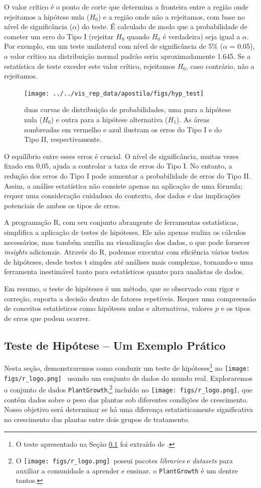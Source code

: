 \documentclass[article]{memoir}
\newcommand{\rlogo}{\protect\texttt{[image: figs/r\_logo.png]}}
\begin{document}
O valor crítico é o ponto de corte que determina a fronteira entre a região onde rejeitamos a hipótese nula ($H_0$) e a região onde não a rejeitamos, com base no nível de significância ($\alpha$) do teste. É calculado de modo que a probabilidade de cometer um erro do Tipo I (rejeitar $H_0$ quando $H_0$ é verdadeira) seja igual a $\alpha$. Por exemplo, em um teste unilateral com nível de significância de 5\% ($\alpha$ = 0.05), o valor crítico na distribuição normal padrão seria aproximadamente 1.645. Se a estatística de teste exceder este valor crítico, rejeitamos $H_0$, caso contrário, não a rejeitamos.


\begin{figure}[ht]
	\centering
	\texttt{[image: ../../vis\_rep\_data/apostila/figs/hyp\_test]}
	\caption{duas curvas de distribuição de probabilidades, uma para a hipótese nula ($H_0$) e outra para a hipótese alternativa ($H_1$). As áreas sombreadas em vermelho e azul ilustram os erros do Tipo I e do Tipo II, respectivamente.}
	\label{fig:hyptest}
\end{figure}


O equilíbrio entre esses erros é crucial. O nível de significância, muitas vezes fixado em 0,05, ajuda a controlar a taxa de erros do Tipo I. No entanto, a redução dos erros do Tipo I pode aumentar a probabilidade de erros do Tipo II. Assim, a análise estatística não consiste apenas na aplicação de uma fórmula; requer uma consideração cuidadosa do contexto, dos dados e das implicações potenciais de ambos os tipos de erros.

A programação R, com seu conjunto abrangente de ferramentas estatísticas, simplifica a aplicação de testes de hipóteses. Ele não apenas realiza os cálculos necessários, mas também auxilia na visualização dos dados, o que pode fornecer \textit{insights} adicionais. Através do R, podemos executar com eficiência vários testes de hipóteses, desde testes t simples até análises mais complexas, tornando-o uma ferramenta inestimável tanto para estatísticos quanto para analistas de dados.

Em resumo, o teste de hipóteses é um método, que se observado com rigor e correção, suporta a decisão dentro de fatores repetíveis. Requer uma compreensão de conceitos estatísticos como hipóteses nulas e alternativas, valores $p$ e os tipos de erros que podem ocorrer. 

\subsection{Teste de Hipótese -- Um Exemplo Prático}
\label{hypo}
Nesta seção, demonstraremos como conduzir um teste de hipóteses\footnote{O teste  apresentado na Seção \ref{hypo} foi extraído de \cite{numberaroundus}.} no \rlogo~ usando um conjunto de dados do mundo real. Exploraremos o conjunto de dados \texttt{PlantGrowth},\footnote{O  \rlogo~possui pacotes \textit{libraries} e \textit{datasets} para auxiliar a comunidade a aprender e ensinar. o \texttt{PlantGrowth} é um dentre tantos.} incluído no \rlogo, que contém dados sobre o peso das plantas sob diferentes condições de crescimento. Nosso objetivo será determinar se há uma diferença estatisticamente significativa no crescimento das plantas entre dois grupos de tratamento.
\end{document}
